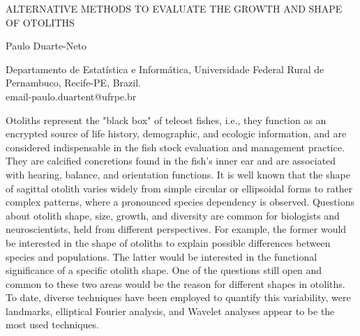 \documentclass[a4paper]{article}
\begin{document}

\Large
 \begin{center}
ALTERNATIVE METHODS TO EVALUATE THE GROWTH AND SHAPE OF OTOLITHS \\ 
\hspace{10pt}

\large

Paulo Duarte-Neto\\

\hspace{10pt}

\small  
Departamento de Estatística e Informática, Universidade Federal Rural de Pernambuco, Recife-PE, Brazil.\\
email-paulo.duartent@ufrpe.br\\


\end{center}

\hspace{10pt}

\normalsize

Otoliths represent the "black box" of teleost fishes, i.e., they function as an encrypted source of life history, demographic, and ecologic information, and are considered indispensable in the fish stock evaluation and management practice. They are calcified concretions found in the fish's inner ear and are associated with hearing, balance, and orientation functions. It is well known that the shape of sagittal otolith varies widely from simple circular or ellipsoidal forms to rather complex patterns, where a pronounced species dependency is observed. Questions about otolith shape, size, growth, and diversity are common for biologists and neuroscientists, held from different perspectives. For example, the former would be interested in the shape of otoliths to explain possible differences between species and populations. The latter would be interested in the functional significance of a specific otolith shape. One of the questions still open and common to these two areas would be the reason for different shapes in otoliths. To date, diverse techniques have been employed to quantify this variability, were landmarks, elliptical Fourier analysis, and Wavelet analyses appear to be the most used techniques.
\end{document}
